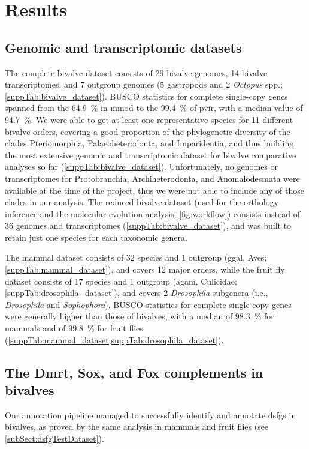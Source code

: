 \section{Results} \label{chapter:molecularEvolution-results}
\subsection{Genomic and transcriptomic datasets}
The complete bivalve dataset consists of 29 bivalve genomes, 14 bivalve transcriptomes, and 7 outgroup genomes (5 gastropods and 2 \textit{Octopus} spp.; \cref{suppTab:bivalve_dataset}). BUSCO statistics for complete single-copy genes spanned from the \qty{64.9}{\percent} in \gls{mmod} to the \qty{99.4}{\percent} of \gls{pvir}, with a median value of \qty{94.7}{\percent}. We were able to get at least one representative species for 11 different bivalve orders, covering a good proportion of the phylogenetic diversity of the clades Pteriomorphia, Palaeoheterodonta, and Imparidentia, and thus building the most extensive genomic and transcriptomic dataset for bivalve comparative analyses so far (\cref{suppTab:bivalve_dataset}). Unfortunately, no genomes or transcriptomes for Protobranchia, Archiheterodonta, and Anomalodesmata were available at the time of the project, thus we were not able to include any of those clades in our analysis. The reduced bivalve dataset (used for the orthology inference and the molecular evolution analysis; \cref{fig:workflow}) consists instead of 36 genomes and transcriptomes (\cref{suppTab:bivalve_dataset}), and was built to retain just one species for each taxonomic genera.

The mammal dataset consists of 32 species and 1 outgroup (\gls{ggal}, Aves; \cref{suppTab:mammal_dataset}), and covers 12 major orders, while the fruit fly dataset consists of 17 species and 1 outgroup (\gls{agam}, Culicidae; \cref{suppTab:drosophila_dataset}), and covers 2 \textit{Drosophila} subgenera (i.e., \textit{Drosophila} and \textit{Sophophora}). BUSCO statistics for complete single-copy genes were generally higher than those of bivalves, with a median of \qty{98.3}{\percent} for mammals and of \qty{99.8}{\percent} for fruit flies (\cref{suppTab:mammal_dataset,suppTab:drosophila_dataset}).

\subsection{The Dmrt, Sox, and Fox complements in bivalves}
Our annotation pipeline managed to successfully identify and annotate \glspl{dsfg} in bivalves, as proved by the same analysis in mammals and fruit flies (see \cref{subSect:dsfgTestDataset}).

